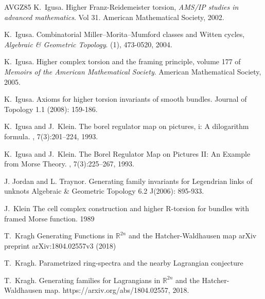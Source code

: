 \documentclass{amsart}
\theoremstyle{definition}
\theoremstyle{remark}
\newtheorem{inductive lemma}[theorem]{Inductive Lemma}
\begin{document}
\begin{thebibliography}{AVGZ85}
K.~Igusa.
\newblock Higher Franz-Reidemeister torsion, 
{\em AMS/IP  studies in advanced mathematics}.
\newblock Vol 31. American Mathematical Society, 2002.

K.~Igusa.
\newblock Combinatorial Miller–Morita–Mumford classes and Witten cycles, 
{\em Algebraic \& Geometric Topology}.
(1), 473-0520, 2004.

K.~Igusa.
\newblock Higher complex torsion and the framing principle, volume 177 of
  {\em Memoirs of the American Mathematical Society}.
\newblock American Mathematical Society, 2005.

K.~Igusa.
\newblock Axioms for higher torsion invariants of smooth bundles.
\newblock Journal of Topology 1.1 (2008): 159-186.

K.~Igusa and J.~Klein.
\newblock The borel regulator map on pictures, i: A dilogarithm formula.
, 7(3):201--224, 1993.

K.~Igusa and J.~Klein.
\newblock The {B}orel {R}egulator {M}ap on {P}ictures {II}: {A}n {E}xample from
  {M}orse {T}heory.
, 7(3):225--267, 1993.

J. Jordan and L. Traynor. 
\newblock Generating family invariants for Legendrian links of unknots
\newblock  Algebraic \& Geometric Topology 6.2 J(2006): 895-933.



J.~Klein
\newblock The cell complex construction and higher R-torsion for bundles with framed Morse function.
 1989


 T.~Kragh
\newblock Generating Functions in $\mathbb {R}^{2n}$ and the Hatcher-Waldhausen map
\newblock  arXiv preprint arXiv:1804.02557v3 (2018)

 T.~Kragh.
\newblock Parametrized ring-spectra and the nearby Lagrangian conjecture




T.~Kragh.
\newblock Generating families for {L}agrangians in $\mathbb{R}^{2n}$ and the
  {H}atcher-{W}aldhausen map.
\newblock https://arxiv.org/abs/1804.02557, 2018.







\end{thebibliography}
\end{document}
